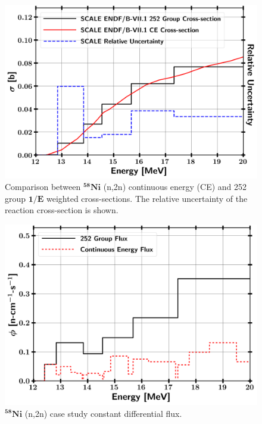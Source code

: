 \begin{figure}[!htb]
	\centering
	\includegraphics[width=13cm]{Figures/Chapter3/nin2n_b_u.png}
	\caption[Comparison between $\mathrm{^{58}Ni}$ (n,2n) continuous energy (CE) and 252 group $\mathrm{1/E}$ weighted cross-sections. The relative uncertainty of the reaction cross-section is shown.]{Comparison between $\mathbf{^{58}Ni}$ (n,2n) continuous energy (CE) and 252 group $\mathbf{1/E}$ weighted cross-sections. The relative uncertainty of the reaction cross-section is shown.}
	\label{fig:nixs}
\end{figure}

\begin{figure}[!htb]
	\centering	
	\includegraphics[width=13cm]{Figures/Chapter3/example_Flux.png}
	\caption{$\mathbf{^{58}Ni}$ (n,2n) case study constant differential flux.}
	\label{fig:testflux}
\end{figure}

